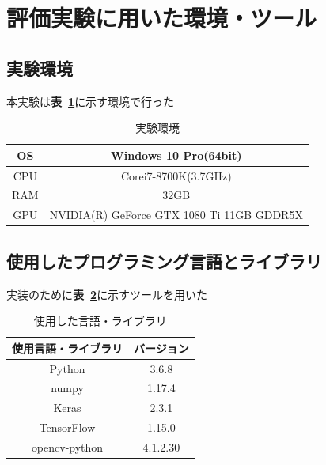 \documentclass[a4j, 11pt]{jreport}
\newcommand{\tabref}[1]{\textbf{表~\ref{#1}}}
\begin{document}
\section{評価実験に用いた環境・ツール}
\subsection{実験環境}
本実験は\tabref{spec}に示す環境で行った
\begin{table}[H]
	\caption{実験環境}
	\centering
	\label{spec}
	\begin{tabular}{|c|c|}
	\hline
	OS  & Windows 10 Pro(64bit)                      \\ \hline
	CPU & Corei7-8700K(3.7GHz)                       \\ \hline
	RAM & 32GB                                       \\ \hline
	GPU & NVIDIA(R) GeForce  GTX 1080 Ti 11GB GDDR5X \\ \hline
	
\end{tabular}

\end{table}
\subsection{使用したプログラミング言語とライブラリ}
実装のために\tabref{tb:environment}に示すツールを用いた
\begin{table}[H]
	\caption{使用した言語・ライブラリ}
	\label{tb:environment}
	\centering
	\begin{tabular}{cc}
	\hline
	\multicolumn{1}{|c}{使用言語・ライブラリ}    & \multicolumn{1}{c|}{バージョン}    \\ \hline \hline
	\multicolumn{1}{|c}{Python}        & \multicolumn{1}{c|}{3.6.8}    \\ \hline
	\multicolumn{1}{|c}{numpy}         & \multicolumn{1}{c|}{1.17.4}   \\ \hline
	\multicolumn{1}{|c}{Keras}         & \multicolumn{1}{c|}{2.3.1}    \\ \hline
	\multicolumn{1}{|c}{TensorFlow}    & \multicolumn{1}{c|}{1.15.0}   \\ \hline
	\multicolumn{1}{|c}{opencv-python} & \multicolumn{1}{c|}{4.1.2.30} \\ \hline
	\end{tabular}
\end{table}
\end{document}
